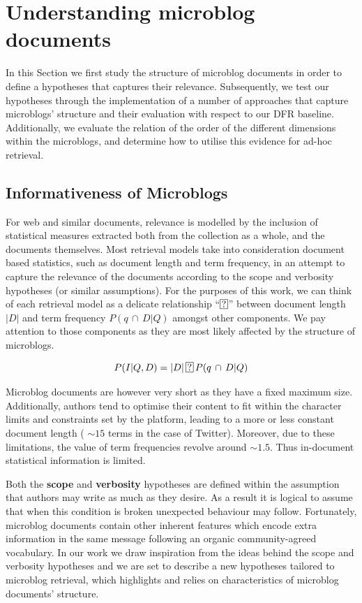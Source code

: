 \section{Understanding microblog documents}
\label{discussion}

In this Section we first study the structure of microblog documents in order to define a hypotheses that captures their relevance. Subsequently, we test our hypotheses through the implementation of a number of approaches that capture microblogs' structure and their evaluation with respect to our DFR baseline. Additionally, we evaluate the relation of the order of the different dimensions within the microblogs, and determine how to utilise this evidence for ad-hoc retrieval.

\subsection{Informativeness of Microblogs}

For web and similar documents, relevance is modelled by the inclusion of statistical measures extracted both from the collection as a whole, and the documents themselves. Most retrieval models take into consideration document based statistics, such as document length and term frequency, in an attempt to capture the relevance of the documents according to the scope and verbosity hypotheses (or similar assumptions). For the purposes of this work, we can think of each retrieval model as a delicate relationship ``\(\circled{?}\)'' between document length \(|D|\) and term frequency \( P(q\, \cap\, D | Q)\) amongst other components. We pay attention to those components as they are most likely affected by the structure of microblogs.

\begin{equation}
 P(I|Q,D) = |D|\, \circled{?}\, P(q\, \cap\, D | Q)
  \vspace{0.5cm}
\end{equation}

Microblog documents are however very short as they have a fixed maximum size. Additionally, authors tend to optimise their content to fit within the character limits and constraints set by the platform, leading to a more or less constant document length ( \(\sim15\) terms in the case of Twitter). Moreover, due to these limitations, the value of term frequencies revolve around \(\sim1.5\). Thus in-document statistical information is limited.

Both the \textbf{scope} and \textbf{verbosity} hypotheses are defined within the assumption that authors may write as much as they desire. As a result it is logical to assume that when this condition is broken unexpected behaviour may follow. Fortunately, microblog documents contain other inherent features which encode extra information in the same message following an organic community-agreed vocabulary. In our work we draw inspiration from the ideas behind the scope and verbosity hypotheses and we are set to describe a new hypotheses tailored to microblog retrieval, which highlights and relies on characteristics of microblog documents' structure. 

